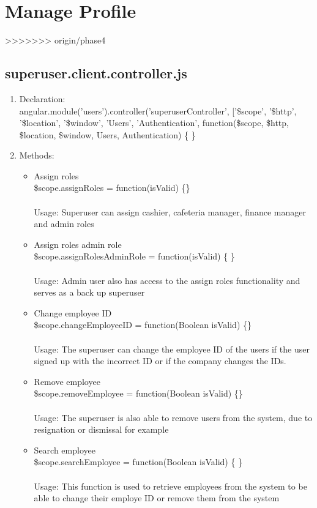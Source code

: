 \documentclass[a4paper,12pt]{article}
\begin{document}
\section{Manage Profile}
>>>>>>> origin/phase4
\subsection{superuser.client.controller.js}
\begin{enumerate}
\item Declaration: \\ angular.module('users').controller('superuserController', ['\$scope', '\$http', '\$location', '\$window', 'Users', 'Authentication',
	function(\$scope, \$http, \$location, \$window, Users, Authentication) \{ \}
\item Methods: 
	\begin{itemize}
		\item Assign roles \\ \$scope.assignRoles = function(isValid) \{\} \\ \\
		Usage: Superuser can assign cashier, cafeteria manager, finance manager and admin roles
		\item Assign roles admin role \\ \$scope.assignRolesAdminRole = function(isValid) \{ \} \\ \\
		Usage: Admin user also has access to the assign roles functionality and serves as a back up superuser
		\item Change employee ID \\ \$scope.changeEmployeeID = function(Boolean isValid) \{\} \\ \\
		Usage: The superuser can change the employee ID of the users if the user signed up with the incorrect ID or if the company changes the IDs.
		\item Remove employee \\ \$scope.removeEmployee = function(Boolean isValid) \{\}
		\\ \\ Usage: The superuser is also able to remove users from the system, due to resignation or dismissal for example
		\item Search employee \\ \$scope.searchEmployee = function(Boolean isValid) \{ \}
		\\ \\ Usage: This function is used to retrieve employees from the system to be able to change their employe ID or remove them from the system

\end{itemize}
\end{enumerate}
\end{document}
